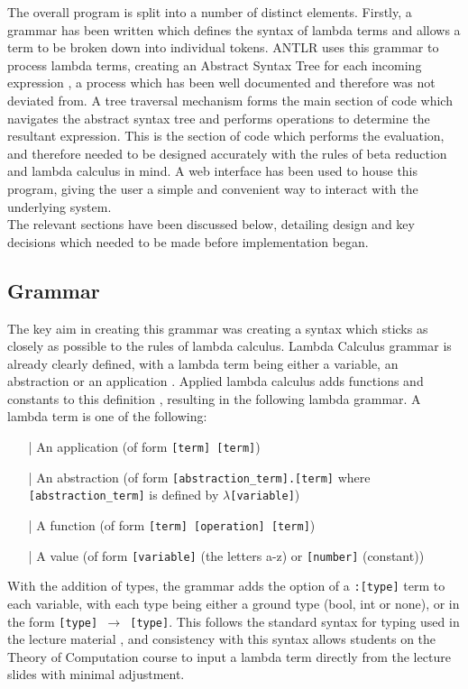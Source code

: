 \documentclass[a4paper,11pt]{report}
\begin{document}
The overall program is split into a number of distinct elements. Firstly, a grammar has been written which defines the syntax of lambda terms and allows a term to be broken down into individual tokens. ANTLR uses this grammar to process lambda terms, creating an Abstract Syntax Tree for each incoming expression \cite{Parr2012}, a process which has been well documented and therefore was not deviated from. A tree traversal mechanism forms the main section of code which navigates the abstract syntax tree and performs operations to determine the resultant expression. This is the section of code which performs the evaluation, and therefore needed to be designed accurately with the rules of beta reduction and lambda calculus in mind. A web interface has been used to house this program, giving the user a simple and convenient way to interact with the underlying system.\\

The relevant sections have been discussed below, detailing design and key decisions which needed to be made before implementation began. %

\subsection{Grammar}

The key aim in creating this grammar was creating a syntax which sticks as closely as possible to the rules of lambda calculus. Lambda Calculus grammar is already clearly defined, with a lambda term being either a variable, an abstraction or an application \cite{Hankin2004}. Applied lambda calculus adds functions and constants to this definition \cite{Slonneger1995}, resulting in the following lambda grammar. A lambda term is one of the following:

\begin{itemize}
\item[|] An application (of form \texttt{[term] [term]})
\item[|] An abstraction (of form \texttt{[abstraction_term].[term]} where \texttt{[abstraction_term]} is defined by \texttt{$\lambda$[variable]})
\item[|] A function (of form \texttt{[term] [operation] [term]})
\item[|] A value (of form \texttt{[variable]} (the letters a-z) or \texttt{[number]} (constant))
\end{itemize}

With the addition of types, the grammar adds the option of a \texttt{:[type]} term to each variable, with each type being either a ground type (bool, int or none), or in the form \texttt{[type] $\rightarrow$ [type]}. This follows the standard syntax for typing used in the lecture material \cite{Hankin2004} \cite{Gay2019}, and consistency with this syntax allows students on the Theory of Computation course to input a lambda term directly from the lecture slides with minimal adjustment.
\end{document}
